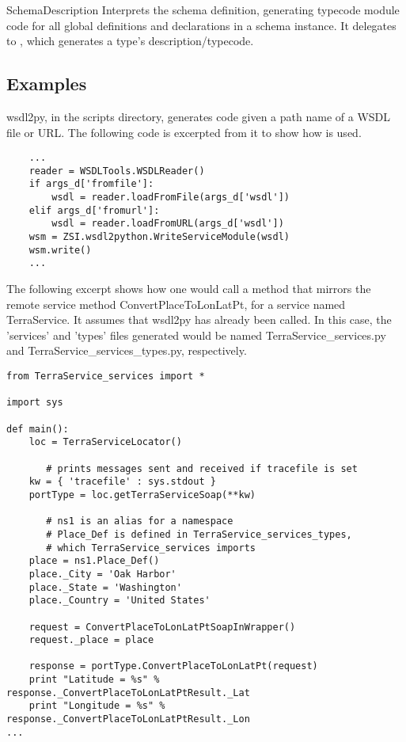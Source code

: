 \begin{classdesc}{SchemaDescription}{}
Interprets the schema definition, generating typecode module code
for all global definitions and declarations in a schema instance.
It delegates to , which generates a type's
description/typecode.
\end{classdesc}

\subsection{Examples}

wsdl2py, in the scripts directory, generates code given a 
path name of a WSDL file or URL.  The following code is excerpted from it to
show how  is used.

\begin{verbatim}
    ...
    reader = WSDLTools.WSDLReader()
    if args_d['fromfile']:
        wsdl = reader.loadFromFile(args_d['wsdl'])
    elif args_d['fromurl']:
        wsdl = reader.loadFromURL(args_d['wsdl'])
    wsm = ZSI.wsdl2python.WriteServiceModule(wsdl)
    wsm.write()
    ...
\end{verbatim}

The following excerpt shows how one would call a method that mirrors
the remote service method ConvertPlaceToLonLatPt, for a service named
TerraService. It assumes that wsdl2py has already been called.
In this case, the 'services' and 'types' files generated would
be named TerraService_services.py and TerraService_services_types.py,
respectively.

\begin{verbatim}
from TerraService_services import *

import sys

def main():
    loc = TerraServiceLocator()

       # prints messages sent and received if tracefile is set
    kw = { 'tracefile' : sys.stdout }
    portType = loc.getTerraServiceSoap(**kw)

       # ns1 is an alias for a namespace
       # Place_Def is defined in TerraService_services_types,
       # which TerraService_services imports
    place = ns1.Place_Def()
    place._City = 'Oak Harbor'
    place._State = 'Washington'
    place._Country = 'United States'

    request = ConvertPlaceToLonLatPtSoapInWrapper()
    request._place = place

    response = portType.ConvertPlaceToLonLatPt(request)
    print "Latitude = %s" % response._ConvertPlaceToLonLatPtResult._Lat
    print "Longitude = %s" % response._ConvertPlaceToLonLatPtResult._Lon
...

\end{verbatim}

